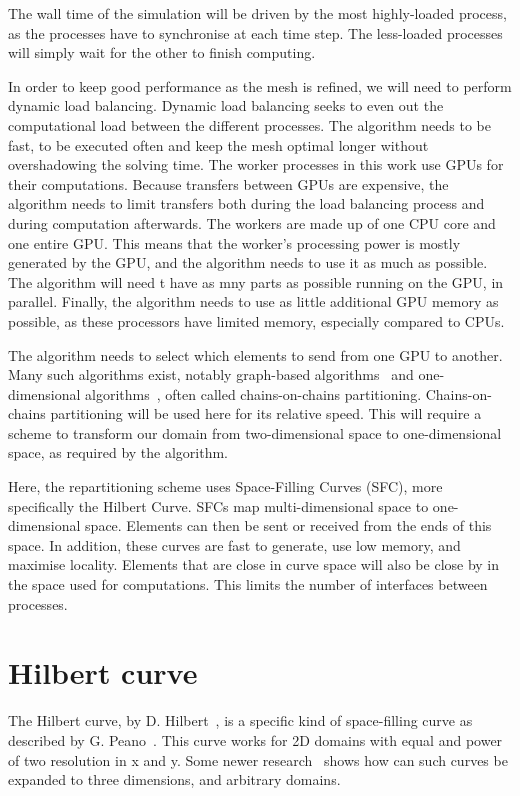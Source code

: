 The wall time of the simulation will be driven by the most highly-loaded process, as the processes
have to synchronise at each time step. The less-loaded processes will simply wait for the other to
finish computing.

In order to keep good performance as the mesh is refined, we will need to perform dynamic load
balancing. Dynamic load balancing seeks to even out the computational load between the different
processes. The algorithm needs to be fast, to be executed often and keep the mesh optimal longer
without overshadowing the solving time. The worker processes in this work use GPUs for their
computations. Because transfers between GPUs are expensive, the algorithm needs to limit transfers
both during the load balancing process and during computation afterwards. The workers are made up of
one CPU core and one entire GPU. This means that the worker's processing power is mostly generated
by the GPU, and the algorithm needs to use it as much as possible. The algorithm will need t have
as mny parts as possible running on the GPU, in parallel. Finally, the algorithm needs to use as
little additional GPU memory as possible, as these processors have limited memory, especially
compared to CPUs.

The algorithm needs to select which elements to send from one GPU to another. Many such algorithms
exist, notably graph-based algorithms~\cite{Karypis1998} and one-dimensional
algorithms~\cite{Pinar2004}, often called chains-on-chains partitioning. Chains-on-chains
partitioning will be used here for its relative speed. This will require a scheme to transform our
domain from two-dimensional space to one-dimensional space, as required by the algorithm.

Here, the repartitioning scheme uses Space-Filling Curves (SFC), more specifically the Hilbert
Curve. SFCs map multi-dimensional space to one-dimensional space. Elements can then be sent or
received from the ends of this space. In addition, these curves are fast to generate, use low
memory, and maximise locality. Elements that are close in curve space will also be close by in the
space used for computations. This limits the number of interfaces between processes.

\section{Hilbert curve} \label{section:load_balancing:hilbert_curve}
The Hilbert curve, by D. Hilbert~\cite{Hilbert1891}, is a specific kind of space-filling curve as
described by G. Peano~\cite{Peano1890}. This curve works for 2D domains with equal and power of two
resolution in x and y. Some newer research~\cite{Haverkort2011} shows how can such curves be
expanded to three dimensions, and arbitrary domains.

